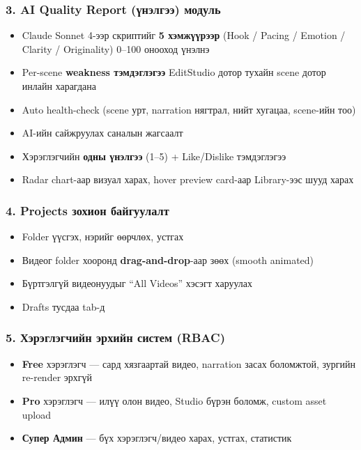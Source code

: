 \subsubsection*{3. AI Quality Report (үнэлгээ) модуль}
\begin{itemize}
  \item Claude Sonnet 4-ээр скриптийг \textbf{5 хэмжүүрээр} (Hook / Pacing / Emotion / Clarity / Originality) 0--100 онооход үнэлнэ
  \item Per-scene \textbf{weakness тэмдэглэгээ} EditStudio дотор тухайн scene дотор инлайн харагдана
  \item Auto health-check (scene урт, narration нягтрал, нийт хугацаа, scene-ийн тоо)
  \item AI-ийн сайжруулах саналын жагсаалт
  \item Хэрэглэгчийн \textbf{одны үнэлгээ} (1--5) + Like/Dislike тэмдэглэгээ
  \item Radar chart-аар визуал харах, hover preview card-аар Library-ээс шууд харах
\end{itemize}

\subsubsection*{4. Projects зохион байгуулалт}
\begin{itemize}
  \item Folder үүсгэх, нэрийг өөрчлөх, устгах
  \item Видеог folder хооронд \textbf{drag-and-drop}-аар зөөх (smooth animated)
  \item Бүртгэлгүй видеонуудыг ``All Videos'' хэсэгт харуулах
  \item Drafts тусдаа tab-д
\end{itemize}

\subsubsection*{5. Хэрэглэгчийн эрхийн систем (RBAC)}
\begin{itemize}
  \item \textbf{Free} хэрэглэгч --- сард хязгаартай видео, narration засах боломжтой, зургийн re-render эрхгүй
  \item \textbf{Pro} хэрэглэгч --- илүү олон видео, Studio бүрэн боломж, custom asset upload
  \item \textbf{Супер Админ} --- бүх хэрэглэгч/видео харах, устгах, статистик
\end{itemize}

